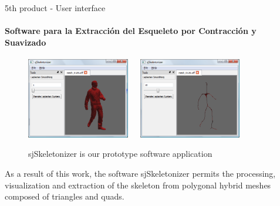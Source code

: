\documentclass[10pt, compress, english]{beamer}
\begin{document}
\begin{frame}{5th product - User interface}


\framesubtitle{Software para la Extracción del Esqueleto por Contracción y Suavizado}


\begin{figure}
\begin{centering}
\includegraphics[width=0.4\textwidth]{img/sjSkeletonizer01}~~~\includegraphics[width=0.4\textwidth]{img/sjSkeletonizer02}
\par\end{centering}

\protect\caption{sjSkeletonizer is our prototype software application}


\end{figure}



As a result of this work, the software sjSkeletonizer permits the
processing, visualization and extraction of the skeleton from polygonal
hybrid meshes composed of triangles and quads.

\end{frame}
\end{document}
